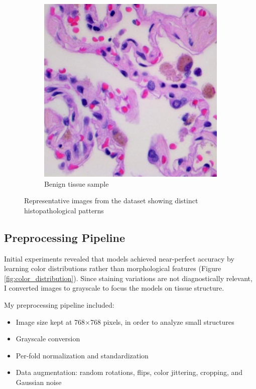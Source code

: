\documentclass[10pt,twocolumn]{article}
\begin{document}
\begin{figure}[h]
\begin{subfigure}{0.48\columnwidth}
\includegraphics[width=\linewidth]{imgs/benign.jpg}
\caption{Benign tissue sample}
\end{subfigure}
\caption{Representative images from the dataset showing distinct histopathological patterns}
\label{fig:dataset_samples}
\end{figure}

\subsection{Preprocessing Pipeline}
Initial experiments revealed that models achieved near-perfect accuracy by learning color distributions rather than morphological features (Figure \ref{fig:color_distribution}). Since staining variations are not diagnostically relevant, I converted images to grayscale to focus the models on tissue structure.

My preprocessing pipeline included:
\begin{itemize}
    \item Image size kept at 768×768 pixels, in order to analyze small structures
    \item Grayscale conversion
    \item Per-fold normalization and standardization
    \item Data augmentation: random rotations, flips, color jittering, cropping, and Gaussian noise
\end{itemize}
\end{document}
